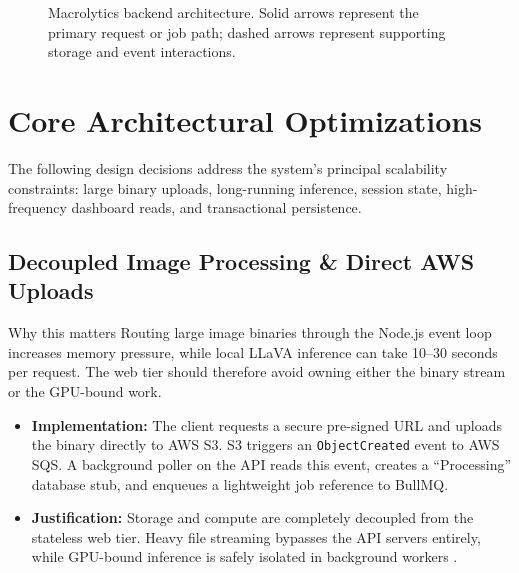 \documentclass[11pt,a4paper,twoside]{article}
\begin{document}
\begin{figure}[H]
\caption{Macrolytics backend architecture. Solid arrows represent the primary request or job path; dashed arrows represent supporting storage and event interactions.}
\end{figure}
\FloatBarrier

\section{Core Architectural Optimizations}

The following design decisions address the system's principal scalability constraints: large binary uploads,
long-running inference, session state, high-frequency dashboard reads, and transactional persistence.

\subsection{Decoupled Image Processing \& Direct AWS Uploads}
\begin{designbox}{Why this matters}
Routing large image binaries through the Node.js event loop increases memory pressure, while local LLaVA inference
can take 10--30 seconds per request. The web tier should therefore avoid owning either the binary stream or the GPU-bound work.
\end{designbox}

\begin{itemize}
  \item \textbf{Implementation:} The client requests a secure pre-signed URL and uploads the binary directly to AWS S3. S3 triggers an \texttt{ObjectCreated} event to AWS SQS. A background poller on the API reads this event, creates a ``Processing'' database stub, and enqueues a lightweight job reference to BullMQ.
  \item \textbf{Justification:} Storage and compute are completely decoupled from the stateless web tier. Heavy file streaming bypasses the API servers entirely, while GPU-bound inference is safely isolated in background workers \cite{xu2020system}.
\end{itemize}
\end{document}
